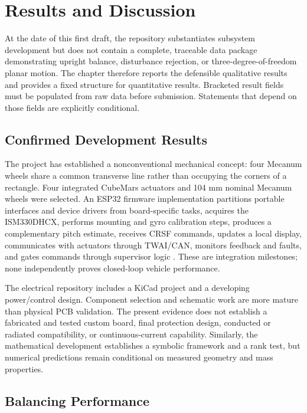 \chapter{Results and Discussion}\label{ch:results-and-discussion}

At the date of this first draft, the repository substantiates subsystem
development but does not contain a complete, traceable data package
demonstrating upright balance, disturbance rejection, or
three-degree-of-freedom planar motion. The chapter therefore reports the
defensible qualitative results and provides a fixed structure for
quantitative results. Bracketed result fields must be populated from raw
data before submission. Statements that depend on those fields are
explicitly conditional.

\section{Confirmed Development Results}\label{confirmed-development-results}

The project has established a nonconventional mechanical concept: four
Mecanum wheels share a common transverse line rather than occupying the
corners of a rectangle. Four integrated CubeMars actuators and 104 mm
nominal Mecanum wheels were selected. An ESP32 firmware implementation
partitions portable interfaces and device drivers from board-specific
tasks, acquires the ISM330DHCX, performs mounting and gyro calibration
steps, produces a complementary pitch estimate, receives CRSF commands,
updates a local display, communicates with actuators through TWAI\slash{}CAN,
monitors feedback and faults, and gates commands through supervisor
logic \cite{zephyr_repo}. These are integration milestones; none independently
proves closed-loop vehicle performance.

The electrical repository includes a KiCad project and a developing
power\slash{}control design. Component selection and schematic work are more
mature than physical PCB validation. The present evidence does not
establish a fabricated and tested custom board, final protection design,
conducted or radiated compatibility, or continuous-current capability.
Similarly, the mathematical development establishes a symbolic framework
and a rank test, but numerical predictions remain conditional on
measured geometry and mass properties.

\section{Balancing Performance}\label{balancing-performance}

